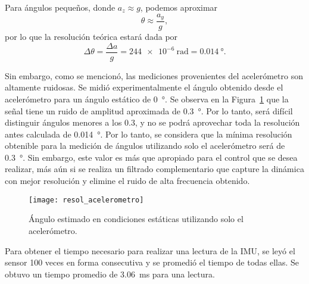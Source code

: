 Para ángulos pequeños, donde $a_z \approx g$, podemos aproximar
$$\theta \approx \frac{a_y}{g},$$
por lo que la resolución teórica estará dada por
$$\Delta \theta = \frac{\Delta a}{g} = \qty{244e-6}{\radian} = \qty{0.014}{\degree}.$$

Sin embargo, como se mencionó, las mediciones provenientes del acelerómetro son altamente ruidosas. Se midió experimentalmente el ángulo obtenido desde el acelerómetro para un ángulo estático de \qty{0}{\degree}. Se observa en la Figura~\ref{fig:ruido-acel} que la señal tiene un ruido de amplitud aproximada de \qty{0.3}{\degree}. Por lo tanto, será difícil distinguir ángulos menores a los \qty{0.3}{\deg}, y no se podrá aprovechar toda la resolución antes calculada de \qty{0.014}{\degree}. Por lo tanto, se considera que la mínima resolución obtenible para la medición de ángulos utilizando solo el acelerómetro será de \qty{0.3}{\degree}. Sin embargo, este valor es más que apropiado para el control que se desea realizar, más aún si se realiza un filtrado complementario que capture la dinámica con mejor resolución y elimine el ruido de alta frecuencia obtenido.

\begin{figure}[!tbp]
    \centering
    \texttt{[image: resol\_acelerometro]}
    \caption{Ángulo estimado en condiciones estáticas utilizando solo el acelerómetro.}
    \label{fig:ruido-acel}
\end{figure}

Para obtener el tiempo necesario para realizar una lectura de la IMU, se leyó el sensor 100 veces en forma consecutiva y se promedió el tiempo de todas ellas. Se obtuvo un tiempo promedio de \qty{3.06}{\ms} para una lectura.

